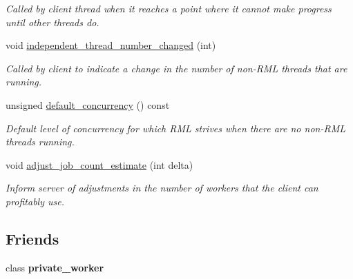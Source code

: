 \begin{DoxyCompactItemize}
\begin{DoxyCompactList}\small\item\em Called by client thread when it reaches a point where it cannot make progress until other threads do. \end{DoxyCompactList}\item 
void \hyperlink{classtbb_1_1internal_1_1rml_1_1private__server_a90f2055284be25ccc067f8b29d537f11}{independent\+\_\+thread\+\_\+number\+\_\+changed} (int)
\begin{DoxyCompactList}\small\item\em Called by client to indicate a change in the number of non-\/\+R\+M\+L threads that are running. \end{DoxyCompactList}\item 
unsigned \hyperlink{classtbb_1_1internal_1_1rml_1_1private__server_aefeaa2a9c0f2fd98c7af1976f7798923}{default\+\_\+concurrency} () const 
\begin{DoxyCompactList}\small\item\em Default level of concurrency for which R\+M\+L strives when there are no non-\/\+R\+M\+L threads running. \end{DoxyCompactList}\item 
\hypertarget{classtbb_1_1internal_1_1rml_1_1private__server_a40e8adfbed393b76f1f5f485f4b6f916}{}void \hyperlink{classtbb_1_1internal_1_1rml_1_1private__server_a40e8adfbed393b76f1f5f485f4b6f916}{adjust\+\_\+job\+\_\+count\+\_\+estimate} (int delta)\label{classtbb_1_1internal_1_1rml_1_1private__server_a40e8adfbed393b76f1f5f485f4b6f916}

\begin{DoxyCompactList}\small\item\em Inform server of adjustments in the number of workers that the client can profitably use. \end{DoxyCompactList}\end{DoxyCompactItemize}
\subsection*{Friends}
\begin{DoxyCompactItemize}
\item 
\hypertarget{classtbb_1_1internal_1_1rml_1_1private__server_af1df28b1fce17bd3ac403abe94d1f331}{}class {\bfseries private\+\_\+worker}\label{classtbb_1_1internal_1_1rml_1_1private__server_af1df28b1fce17bd3ac403abe94d1f331}

\end{DoxyCompactItemize}
